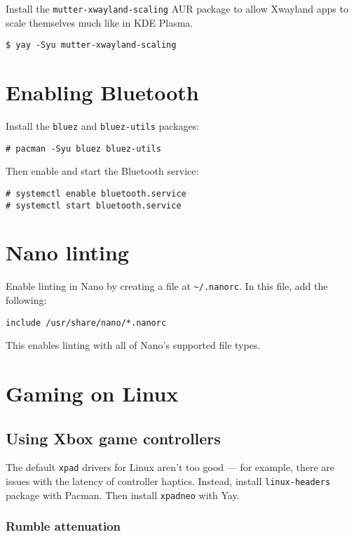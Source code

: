 \documentclass[a4paper]{article}
\begin{document}
Install the \lstinline|mutter-xwayland-scaling| AUR package to allow Xwayland apps to scale themselves much like in KDE Plasma.
\begin{lstlisting}
$ yay -Syu mutter-xwayland-scaling
\end{lstlisting}

\section{Enabling Bluetooth}

Install the \lstinline|bluez| and \lstinline|bluez-utils| packages:
\begin{lstlisting}
# pacman -Syu bluez bluez-utils
\end{lstlisting}

Then enable and start the Bluetooth service:
\begin{lstlisting}
# systemctl enable bluetooth.service
# systemctl start bluetooth.service
\end{lstlisting}

\section{Nano linting}

Enable linting in Nano by creating a file at \lstinline|~/.nanorc|.
In this file, add the following:
\begin{lstlisting}
include /usr/share/nano/*.nanorc
\end{lstlisting}
This enables linting with all of Nano's supported file types.

\section{Gaming on Linux}

\subsection{Using Xbox game controllers}

The default \lstinline|xpad| drivers for Linux aren't too good --- for example, there are issues with the latency of controller haptics.
Instead, install \lstinline|linux-headers| package with Pacman.
Then install \lstinline|xpadneo| with Yay.

\subsubsection{Rumble attenuation}
\end{document}
